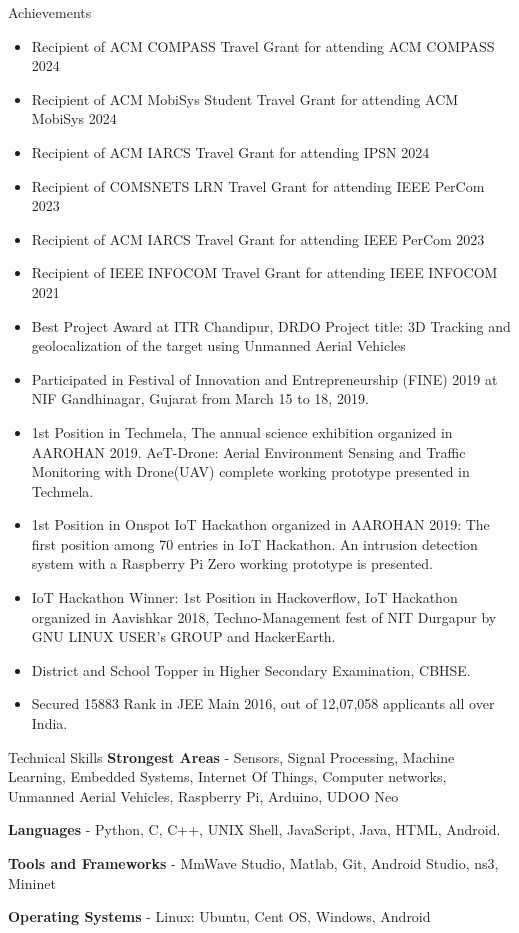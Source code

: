 \documentclass{resume} %
\begin{document}
	\begin{rSection}{Achievements} 
		\begin{itemize}
			\item Recipient of ACM COMPASS Travel Grant for attending ACM COMPASS 2024
			\item Recipient of ACM MobiSys Student Travel Grant for attending ACM MobiSys 2024
			\item Recipient of ACM IARCS Travel Grant for attending IPSN 2024
			\item Recipient of COMSNETS LRN Travel Grant for attending IEEE PerCom 2023
			\item Recipient of ACM IARCS Travel Grant for attending IEEE PerCom 2023
			\item Recipient of IEEE INFOCOM Travel Grant for attending IEEE INFOCOM 2021
			\item Best Project Award at ITR Chandipur, DRDO Project title: 3D Tracking and geolocalization of the target using Unmanned Aerial Vehicles
			\item Participated in Festival of Innovation and Entrepreneurship (FINE) 2019 at NIF Gandhinagar, Gujarat from March 15 to 18, 2019.
			\item 1st Position in Techmela, The annual science exhibition organized in AAROHAN 2019. AeT-Drone: Aerial Environment Sensing and Traffic Monitoring with Drone(UAV) complete working prototype presented in Techmela.
			\item 1st Position in Onspot IoT Hackathon organized in AAROHAN 2019: The first position among 70 entries in IoT Hackathon. An intrusion detection system with a Raspberry Pi Zero working prototype is presented.
			\item IoT Hackathon Winner: 1st Position in Hackoverflow, IoT Hackathon organized in Aavishkar 2018, Techno-Management fest of NIT Durgapur by GNU LINUX USER's GROUP and HackerEarth.
			\item District and School Topper in Higher Secondary Examination, CBHSE.
			\item Secured 15883 Rank in JEE Main 2016, out of 12,07,058
			applicants all over India.
		\end{itemize}
	\end{rSection}
	\begin{rSection}{Technical Skills}
		\textbf{Strongest Areas} - Sensors, Signal Processing, Machine Learning, Embedded Systems, Internet Of Things, Computer networks, Unmanned Aerial Vehicles, Raspberry Pi, Arduino, UDOO Neo
		
		\textbf{Languages} - Python, C, C++, UNIX Shell, JavaScript, Java, HTML, Android.
		
		\textbf{Tools and Frameworks} - MmWave Studio, Matlab, Git, Android Studio, ns3, Mininet
		
		\textbf{Operating Systems} - Linux: Ubuntu, Cent OS, Windows, Android\\
	\end{rSection}
	
\end{document}
